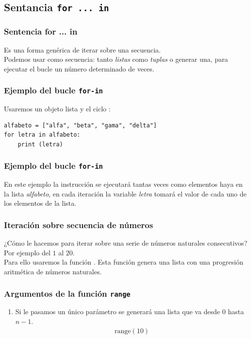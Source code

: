 \documentclass[12pt]{beamer}
\begin{document}
\subsection*{Sentancia \texttt{for ... in}}

\begin{frame}
\frametitle{Sentencia for ... in}
Es una forma genérica de iterar sobre una secuencia.
\\
\bigskip
\pause
Podemos usar como secuencia: \pause tanto \emph{listas} como \emph{tuplas} o generar una, para ejecutar el bucle un número determinado de veces.
\end{frame}
\begin{frame}[fragile]
\frametitle{Ejemplo del bucle \texttt{for-in}}
Usaremos un objeto lista y el ciclo :
\pause
\begin{lstlisting}[caption=Ejemplo del ciclo for-in]
alfabeto = ["alfa", "beta", "gama", "delta"]
for letra in alfabeto:
    print (letra)
\end{lstlisting}
\end{frame}
\begin{frame}[fragile]
\frametitle{Ejemplo del bucle \texttt{for-in}}
En este ejemplo la instrucción  se ejecutará tantas veces como elementos haya en la lista \emph{alfabeto}, en cada iteración la variable \emph{letra} tomará el valor de cada uno de los elementos de la lista.
\end{frame}
\begin{frame}
\frametitle{Iteración sobre secuencia de números}
¿Cómo le hacemos para iterar sobre una serie de números naturales consecutivos? \pause Por ejemplo del $1$ al $20$.
\\
\bigskip
\pause
 Para ello usaremos la función . Esta función genera una lista con una progresión aritmética de números naturales.
 \end{frame}
\begin{frame}
\frametitle{Argumentos de la función \texttt{range}}
\begin{enumerate}[<+->]
\item Si le pasamos un único parámetro se generará una lista que va desde $0$ hasta $n-1$.
\pause
\begin{align*}
\mbox{range} (10)
\end{align*}
\seti
\end{enumerate}  
\end{frame}
\end{document}
